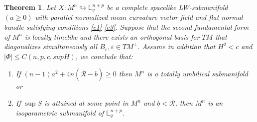 \documentclass[leqno,11pt]{amsart}
\theoremstyle{plain}
\newtheorem{theorem}{\indent\sc Theorem}[section]
\theoremstyle{definition}
\numberwithin{equation}{section}
\begin{document}
\begin{theorem}\label{teo1}
Let $X:M^n\looparrowright \mathbb{L}^{n+p}_{q}$ be a complete spacelike LW-submanifold $(a\geq0)$ with parallel normalized mean curvature vector field and flat normal bundle satisfying conditions \eqref{c1}-\eqref{c3}. Suppose that the second fundamental form of $M^n$ is locally timelike and there exists an orthogonal basis for $TM$ that diagonalizes simultaneously all $B_{\varepsilon},
\varepsilon\in TM^{\perp}.$ Assume in addition that $H^2<c$ and
$|\Phi|\leq C(n,p,c,supH)$, we conclude that: 
\begin{enumerate}
    \item[(i)] If $(n-1)a^2+4n(\overline{\mathcal{R}}-b)\geq 0$ then $M^n$ is a totally umbilical submanifold or
    \item[(ii)] If $\sup S$ is attained at some point in $M^n$ and $b<\overline{\mathcal{R}}$, then $M^n$ is an isoparametric submanifold of $\mathbb{L}_{q}^{n+p}.$
\end{enumerate} 
\end{theorem}
\end{document}

